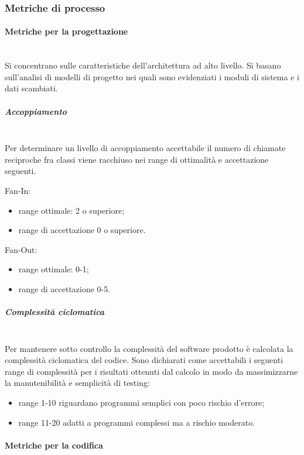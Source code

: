 \subsubsection{Metriche di processo}\label{sec:metriche_processo}

\paragraph{Metriche per la progettazione}\mbox{}\\
Si concentrano sulle caratteristiche dell'architettura ad alto livello. Si basano sull'analisi di modelli di progetto nei quali sono evidenziati i moduli di sistema e i dati scambiati.

\subparagraph{Accoppiamento}\mbox{}\\
Per determinare un livello di accoppiamento accettabile il numero di chiamate reciproche fra classi viene racchiuso nei range di ottimalità e accettazione seguenti.

Fan-In:
\begin{itemize}
	\item range ottimale: 2 o superiore;
	\item range di accettazione 0 o superiore.
\end{itemize}

Fan-Out:
\begin{itemize}
	\item range ottimale: 0-1;
	\item range di accettazione 0-5.
\end{itemize}

\subparagraph{Complessità ciclomatica}\mbox{}\\
Per mantenere sotto controllo la complessità del software prodotto è calcolata la complessità ciclomatica del codice. 
Sono dichiarati come accettabili i seguenti range di complessità per i risultati ottenuti dal calcolo in modo da massimizzarne la manutenibilità e semplicità di testing: 
\begin{itemize}
	\item range 1-10 riguardano programmi semplici con poco rischio d'errore;
	\item range 11-20 adatti a programmi complessi ma a rischio moderato.
\end{itemize}

\paragraph{Metriche per la codifica}\mbox{}

